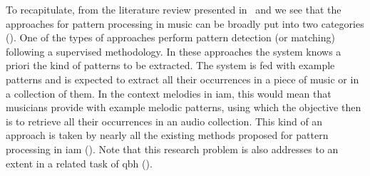 

To recapitulate, from the literature review presented in~ and  we see that the approaches for pattern processing in music can be broadly put into two categories (). One of the types of approaches perform pattern detection (or matching) following a supervised methodology. In these approaches the system knows a priori the kind of patterns to be extracted. The system is fed with example patterns and is expected to extract all their occurrences in a piece of music or in a collection of them. In the context melodies in \gls{iam}, this would mean that musicians provide with example melodic patterns, using which the objective then is to retrieve all their occurrences in an audio collection. This kind of an approach is taken by nearly all the existing methods proposed for pattern processing in \gls{iam} (). Note that this research problem is also addresses to an extent in a related task of \acrfull{qbh} ().

